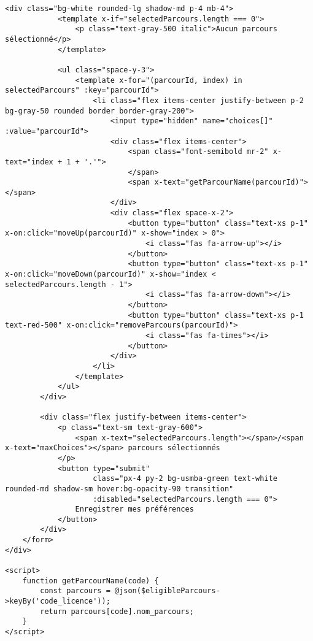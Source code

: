 \documentclass[french,12pt]{report} %
\begin{document}
\begin{lstlisting}[style=htmlstyle,caption={Exemple d'utilisation d'Alpine.js pour la sélection de parcours}]
        <div class="bg-white rounded-lg shadow-md p-4 mb-4">
            <template x-if="selectedParcours.length === 0">
                <p class="text-gray-500 italic">Aucun parcours sélectionné</p>
            </template>
            
            <ul class="space-y-3">
                <template x-for="(parcourId, index) in selectedParcours" :key="parcourId">
                    <li class="flex items-center justify-between p-2 bg-gray-50 rounded border border-gray-200">
                        <input type="hidden" name="choices[]" :value="parcourId">
                        <div class="flex items-center">
                            <span class="font-semibold mr-2" x-text="index + 1 + '.'">
                            </span>
                            <span x-text="getParcourName(parcourId)"></span>
                        </div>
                        <div class="flex space-x-2">
                            <button type="button" class="text-xs p-1" x-on:click="moveUp(parcourId)" x-show="index > 0">
                                <i class="fas fa-arrow-up"></i>
                            </button>
                            <button type="button" class="text-xs p-1" x-on:click="moveDown(parcourId)" x-show="index < selectedParcours.length - 1">
                                <i class="fas fa-arrow-down"></i>
                            </button>
                            <button type="button" class="text-xs p-1 text-red-500" x-on:click="removeParcours(parcourId)">
                                <i class="fas fa-times"></i>
                            </button>
                        </div>
                    </li>
                </template>
            </ul>
        </div>
        
        <div class="flex justify-between items-center">
            <p class="text-sm text-gray-600">
                <span x-text="selectedParcours.length"></span>/<span x-text="maxChoices"></span> parcours sélectionnés
            </p>
            <button type="submit" 
                    class="px-4 py-2 bg-usmba-green text-white rounded-md shadow-sm hover:bg-opacity-90 transition"
                    :disabled="selectedParcours.length === 0">
                Enregistrer mes préférences
            </button>
        </div>
    </form>
</div>

<script>
    function getParcourName(code) {
        const parcours = @json($eligibleParcours->keyBy('code_licence'));
        return parcours[code].nom_parcours;
    }
</script>
\end{lstlisting}
\end{document}
